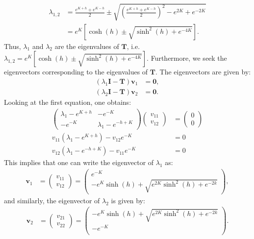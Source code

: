 \documentclass[a4paper]{article}
\begin{document}
\begin{align*}
    \lambda_{1,2} &= \frac{e^{K + h} + e^{K - h}}{2} \pm \sqrt{\left(\frac{e^{K + h} + e^{K - h}}{2}\right)^2 - e^{2K} + e^{-2K}}\\
    &= e^{K}\left[\cosh(h) \pm \sqrt{\sinh^2(h) + e^{-4K}}\right].
\end{align*}Thus, $\lambda_1$ and $\lambda_2$ are the eigenvalues of $\mathbf{T}$, i.e. $\lambda_{1,2} = e^{K}\left[\cosh(h) \pm \sqrt{\sinh^2(h) + e^{-4K}}\right]$.
Furthermore, we seek the eigenvectors corresponding to the eigenvalues of $\mathbf{T}$. The eigenvectors are given by:
\begin{align*}
    (\lambda_1 \mathbf{I} - \mathbf{T})\mathbf{v}_1 &= \mathbf{0},\\
    (\lambda_2 \mathbf{I} - \mathbf{T})\mathbf{v}_2 &= \mathbf{0}.
\end{align*}Looking at the first equation, one obtains:
\begin{align*}
    \begin{pmatrix}
        \lambda_1-e^{K + h} & -e^{-K}\\
        -e^{-K}\ & \lambda_1-e^{-h + K}
    \end{pmatrix}\begin{pmatrix}
        v_{11}\\
        v_{12}
    \end{pmatrix}
    &= \begin{pmatrix}
        0\\
        0
    \end{pmatrix}\\
    v_{11}\left(\lambda_1 - e^{K + h}\right) - v_{12} e^{-K} &= 0\\
    v_{12}\left(\lambda_1 - e^{-h + K}\right) - v_{11} e^{-K} &= 0
\end{align*}This implies that one can write the eigenvector of $\lambda_1$ as:
\begin{align*}
    \mathbf{v}_1 &= \begin{pmatrix}
        v_{11}\\
        v_{12}
    \end{pmatrix} = \begin{pmatrix}
        e^{-K}\\
        -e^K\sinh(h)+\sqrt{e^{2K}\sinh^2(h) + e^{-2k}}
    \end{pmatrix},
\end{align*}and similarly, the eigenvector of $\lambda_2$ is given by:
\begin{align*}
    \mathbf{v}_2 &= \begin{pmatrix}
        v_{21}\\
        v_{22}
    \end{pmatrix} = \begin{pmatrix}
        -e^K\sinh(h)+\sqrt{e^{2K}\sinh^2(h) + e^{-2k}}\\
        -e^{-K}\\
    \end{pmatrix}.
\end{align*}
\end{document}
